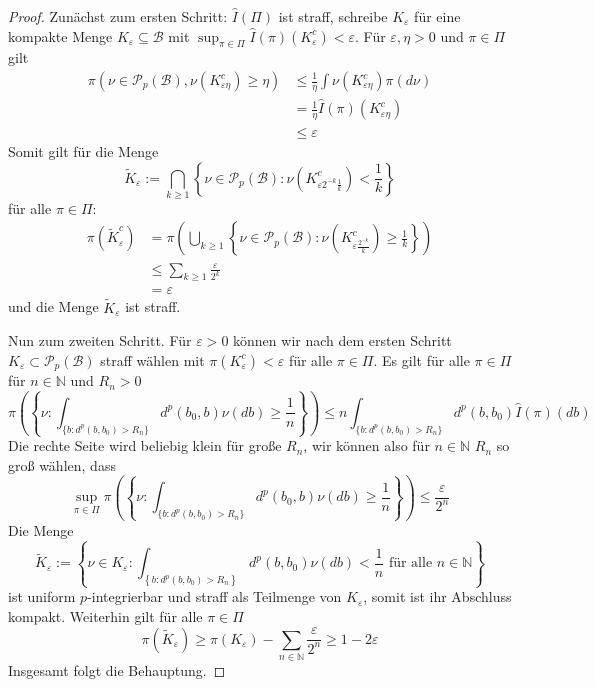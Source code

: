 \begin{proof}
    Zunächst zum ersten Schritt: $\hat{I}(\Pi)$ ist straff, schreibe $K_\varepsilon$ für eine kompakte Menge $K_\varepsilon \subseteq \mathcal{B}$ mit $\sup_{\pi \in \Pi} \hat{I}(\pi)(K_\varepsilon^c) < \varepsilon$. Für $\varepsilon, \eta>0$ und $\pi \in \Pi$ gilt
    \begin{align*}
        \pi\left( \nu \in \mathcal{P}_p(\mathcal{B}), \nu(K_{\varepsilon\eta}^c) \geq \eta\right) &\leq \frac{1}{\eta} \int \nu(K_{\varepsilon\eta}^c) \pi(d\nu) \\
        &= \frac{1}{\eta} \hat{I}(\pi)(K_{\varepsilon\eta}^c) \\
        &\leq \varepsilon
    \end{align*}
    Somit gilt für die Menge 
    $$\tilde{K}_\varepsilon := \bigcap_{k\geq 1} \left\{ \nu \in \mathcal{P}_p(\mathcal{B}): \nu(K_{\varepsilon 2^{-k} \frac{1}{k}}^c) < \frac{1}{k}\right\}$$
    für alle $\pi \in \Pi$:
    \begin{align*}
        \pi(\tilde{K}_\varepsilon^c) &= \pi\left(\bigcup_{k\geq 1}\left\{\nu \in \mathcal{P}_p(\mathcal{B}): \nu(K_{\varepsilon\frac{2^{-k}}{k}}^c) \geq \frac{1}{k}\right\} \right) \\
        &\leq \sum_{k\geq 1} \frac{\varepsilon}{2^k} \\
        &= \varepsilon
    \end{align*}
    und die Menge $\tilde{K}_\varepsilon$ ist straff. 

    Nun zum zweiten Schritt. Für $\varepsilon>0$ können wir nach dem ersten Schritt $K_\varepsilon \subset \mathcal{P}_p(\mathcal{B})$ straff wählen mit $\pi(K_\varepsilon^c)<\varepsilon$ für alle $\pi \in \Pi$.
    Es gilt für alle $\pi \in \Pi$ für $n\in\mathbb{N}$ und $R_n>0$
    $$\pi\left(\left\{ \nu: \int_{\{b: d^p(b,b_0)>R_n\}} d^p(b_0, b) \nu(db) \geq \frac{1}{n}\right\}\right) \leq n \int_{\{b:d^p(b,b_0)>R_n\}} d^p(b, b_0) \hat{I}(\pi)(db)$$
    Die rechte Seite wird beliebig klein für große $R_n$, wir können also für $n\in \mathbb{N}$ $R_n$ so groß wählen, dass
    $$\sup_{\pi \in \Pi} \pi\left(\left\{ \nu: \int_{\{b:d^p(b,b_0)>R_n\}} d^p(b_0, b) \nu(db) \geq \frac{1}{n}\right\}\right) \leq \frac{\varepsilon}{2^n}$$
    Die Menge
    $$\tilde{K}_\varepsilon := \left\{ \nu \in K_\varepsilon: \int_{\left\{b: d^p(b, b_0)>R_n\right\}}d^p(b, b_0) \nu(db) < \frac{1}{n} \text{ für alle }n \in \mathbb{N}\right\}$$
    ist uniform $p$-integrierbar und straff als Teilmenge von $K_\varepsilon$, somit ist ihr Abschluss kompakt. Weiterhin gilt für alle $\pi \in \Pi$
    $$\pi(\tilde{K}_\varepsilon) \geq \pi(K_\varepsilon) - \sum_{n\in\mathbb{N}} \frac{\varepsilon}{2^n} \geq 1 - 2\varepsilon$$
    Insgesamt folgt die Behauptung.
\end{proof}
